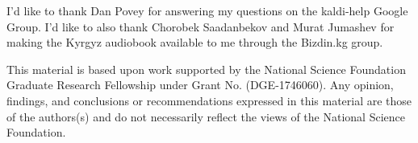 \documentclass[a4paper]{article}
\begin{document}
I'd like to thank Dan Povey for answering my questions on the kaldi-help Google Group. I'd like to also thank Chorobek Saadanbekov and Murat Jumashev for making the Kyrgyz audiobook available to me through the Bizdin.kg group.

This material is based upon work supported by the National Science Foundation Graduate Research Fellowship under Grant No. (DGE-1746060). Any opinion, findings, and conclusions or recommendations expressed in this material are those of the authors(s) and do not necessarily reflect the views of the National Science Foundation.





\newpage



\end{document}
